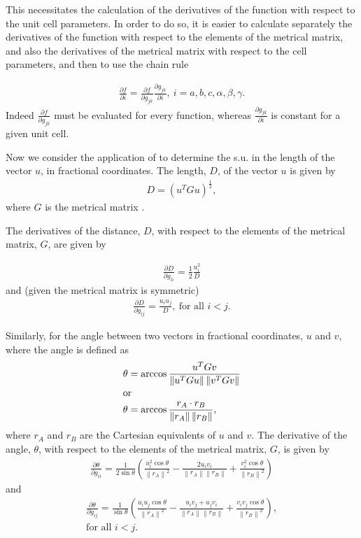 \documentclass[pdf]{iucr}
\newcommand{\mat}[1]{#1}
\newcommand{\norm}[1]{\left\| #1 \right\|}
\newcommand{\partialder}[2]{\frac{\partial #1}{\partial #2}}
\begin{document}
This necessitates the calculation of the derivatives of the function with respect to the unit cell parameters. In order to do so, it is easier to calculate separately the derivatives of the function with respect to the elements of the metrical matrix, and also the derivatives of the metrical matrix with respect to the cell parameters, and then to use the chain rule

\begin{align}
\partialder{f}{i} = \partialder{f}{g_{jk}}\partialder{g_{jk}}{i},\ i=a, b, c, \alpha, \beta, \gamma.
\label{eqn:df_dcell}
\end{align}
Indeed $\partialder{f}{g_{jk}}$ must be evaluated for every function, whereas $\partialder{g_{jk}}{i}$ is constant for a given unit cell.

Now we consider the application of  to determine the s.u. in the length of the vector $u$, in fractional coordinates. The length, $D$, of the  vector $u$ is given by
\begin{align}
D = (u^T \mat{G} u)^\frac{1}{2}
\label{eqn:bond_length},
\end{align}
where $\mat{G}$ is the metrical matrix \textbookref.

The derivatives of the distance, $D$, with respect to the elements of the metrical matrix, $\mat{G}$, are given by

\begin{align}
\partialder{D}{g_{ii}} = \frac{1}{2} \frac{u_i^2}{D}
\label{eqn:d_distance_d_gii}
\end{align}
and (given the metrical matrix is symmetric)
\begin{align}
\partialder{D}{g_{ij}} = \frac{u_i u_j}{D},\ \text{for all $i<j$}.
\label{eqn:d_distance_d_gij}
\end{align}

Similarly, for the angle between two vectors in fractional coordinates, $u$ and $v$, where the angle is defined as
\begin{align}
\theta &= \arccos \frac{u^T\mat{G}v}{\norm{u^T\mat{G}u}\norm{v^T\mat{G}v}} \\
\shortintertext{or}
\theta &= \arccos \frac{r_{A}\cdot r_{B}}{\norm{r_{A}}\norm{r_{B}}}
\label{eqn:angle_cart},
\end{align}
where $r_{A}$ and $r_{B}$ are the Cartesian equivalents of $u$ and $v$. The derivative of the angle, $\theta$, with respect to the elements of the metrical matrix, $\mat{G}$, is given by
\begin{align}
\partialder{\theta}{g_{ii}} = \frac{1}{2 \sin\theta} \left(\frac{u_i^2 \cos{\theta}}{\norm{r_{A}}^2} - \frac{2 u_i v_i }{\norm{r_{A}}\norm{r_{B}}} +\frac{v_i^2 \cos{\theta}}{\norm{r_{B}}^2}\right)
\label{eqn:d_angle_d_gii}
\end{align}
and
\begin{multline}
\partialder{\theta}{g_{ij}} = \frac{1}{\sin\theta} \left(\frac{u_i u_j \cos{\theta}}{\norm{r_{A}}^2} - \frac{u_i v_j + u_j v_i }{\norm{r_{A}}\norm{r_{B}}} +\frac{v_i v_j \cos{\theta}}{\norm{r_{B}}^2}\right),\\ \text{for all $i<j$}.
\label{eqn:d_angle_d_gij}
\end{multline}
\end{document}

